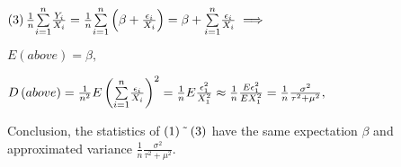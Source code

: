 \documentclass{article}
\begin{document}
$\left( 3\right) \frac{1}{n}\underset{i=1}{\overset{n}{\sum }}\frac{Y_{i}}{%
X_{i}}=\frac{1}{n}\underset{i=1}{\overset{n}{\sum }}\left( \beta +\frac{%
\epsilon _{i}}{X_{i}}\right) =\beta +\underset{i=1}{\overset{n}{\sum }}\frac{%
\epsilon _{i}}{X_{i}}\implies $

$E\left( above\right) =\beta ,$

$D\left( above\right) =\frac{1}{n^{2}}E\left( \underset{i=1}{\overset{n}{%
\sum }}\frac{\epsilon _{i}}{X_{i}}\right) ^{2}=\frac{1}{n}E\frac{\epsilon
_{1}^{2}}{X_{1}^{2}}\approx \frac{1}{n}\frac{E\epsilon _{1}^{2}}{EX_{1}^{2}}=%
\frac{1}{n}\frac{\sigma ^{2}}{\tau ^{2}+\mu ^{2}},$

Conclusion, the statistics of $\left( 1\right) \symbol{126}\left( 3\right) $
have the same expectation $\beta $ and approximated variance  $\frac{1}{n}%
\frac{\sigma ^{2}}{\tau ^{2}+\mu ^{2}}.$
\end{document}
